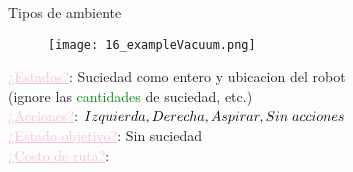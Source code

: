 
    \begin{frame}{Tipos de ambiente}
        \begin{figure}\texttt{[image: 16\_exampleVacuum.png]}\end{figure}
        \small{
            \textcolor{Pink}{\underline{¿Estados?}}: Suciedad como entero y ubicacion del robot \\          \hspace{1.8cm} (ignore las \textcolor{Green}{cantidades} de suciedad, etc.) \\
            \textcolor{Pink}{\underline{¿Acciones?}}: \textcolor{Purple}{$Izquierda, Derecha, Aspirar, %
            Sin \hspace{0.1cm}acciones$} \\
            \textcolor{Pink}{\underline{¿Estado objetivo?}}: Sin suciedad \\
            \textcolor{Pink}{\underline{¿Costo de ruta?}}: 
        }
        \break\break\break\break\break
    \end{frame}
